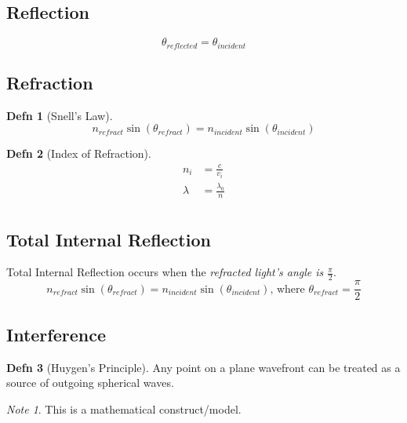 \documentclass[10pt,letterpaper,final,twoside,notitlepage]{article}
\numberwithin{equation}{section} %
\theoremstyle{definition}
\newtheorem{definition}{Defn} %
\theoremstyle{remark}
\newtheorem{note}{Note}[definition] %
\begin{document}
	\subsection*{Reflection} \label{subsec:Reflection}
		\begin{equation} \label{eq:Reflected Light}
			\theta_{reflected} = \theta_{incident}
		\end{equation}
		
	\subsection*{Refraction} \label{subsec:Refraction}
		\begin{definition}[Snell's Law] \label{def:Snell's Law}
			\begin{equation} \label{eq:Refracted Light} 
				n_{refract} \sin \left( \theta_{refract} \right) = n_{incident} \sin \left( \theta_{incident} \right)
			\end{equation}
		\end{definition}
		\begin{definition}[Index of Refraction] \label{def:Index of Refraction}
			\begin{equation} \label{eq:Index of Refraction}
				\begin{aligned}
					n_{i} &= \frac{c}{v_{i}} \\
					\lambda &= \frac{\lambda_{0}}{n} \\
				\end{aligned}
			\end{equation}
		\end{definition}
	
	\subsection*{Total Internal Reflection} \label{subsec:Total Internal Reflection}
		Total Internal Reflection occurs when the \emph{refracted light's angle is $\frac{\pi}{2}$}.
		\begin{equation} \label{eq:Total Internal Reflection}
			n_{refract} \sin \left( \theta_{refract} \right) = n_{incident} \sin \left( \theta_{incident} \right) \text{, where } \theta_{refract} = \frac{\pi}{2}
		\end{equation}
		
	\subsection*{Interference} \label{subsec:Light Interference}
		\begin{definition}[Huygen's Principle] \label{def:Huygen's Principle}
			Any point on a plane wavefront can be treated as a source of outgoing spherical waves.
			\begin{note}
				This is a mathematical construct/model.
			\end{note}
		\end{definition}
\end{document}
